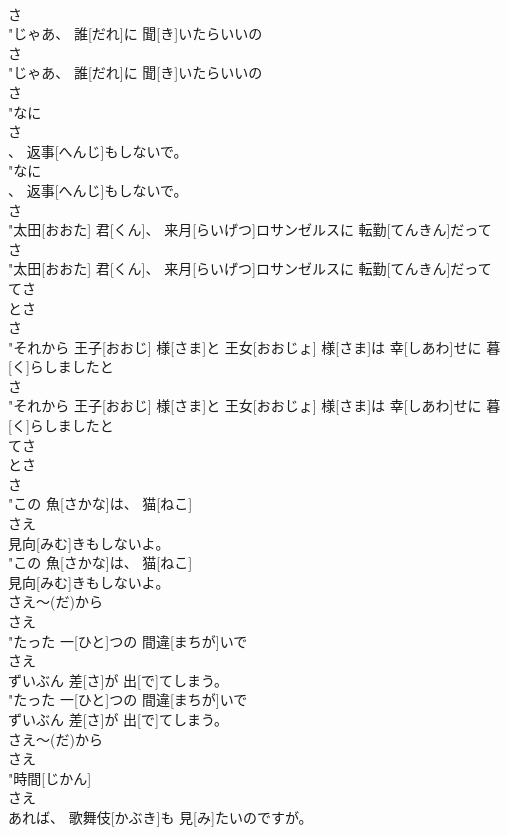 \documentclass[8pt]{extreport}
\begin{document}
\begin{CJK}{UTF8}{min}
\\	さ
\\	"じゃあ、 誰[だれ]に 聞[き]いたらいいの
\\	さ
\\	"じゃあ、 誰[だれ]に 聞[き]いたらいいの
\\	さ
\\	"なに
\\	さ
\\	、 返事[へんじ]もしないで。
\\	"なに
\\	、 返事[へんじ]もしないで。
\\	さ
\\	"太田[おおた] 君[くん]、 来月[らいげつ]ロサンゼルスに 転勤[てんきん]だって
\\	さ
\\	"太田[おおた] 君[くん]、 来月[らいげつ]ロサンゼルスに 転勤[てんきん]だって
\\	てさ 
\\	とさ	
\\	さ
\\	"それから 王子[おおじ] 様[さま]と 王女[おおじょ] 様[さま]は 幸[しあわ]せに 暮[く]らしましたと
\\	さ
\\	"それから 王子[おおじ] 様[さま]と 王女[おおじょ] 様[さま]は 幸[しあわ]せに 暮[く]らしましたと
\\	てさ 
\\	とさ	
\\	さ
\\	"この 魚[さかな]は、 猫[ねこ]
\\	さえ
\\	見向[みむ]きもしないよ。
\\	"この 魚[さかな]は、 猫[ねこ]
\\	見向[みむ]きもしないよ。
\\	さえ～(だ)から 
\\	さえ
\\	"たった 一[ひと]つの 間違[まちが]いで
\\	さえ
\\	ずいぶん 差[さ]が 出[で]てしまう。
\\	"たった 一[ひと]つの 間違[まちが]いで
\\	ずいぶん 差[さ]が 出[で]てしまう。
\\	さえ～(だ)から 
\\	さえ
\\	"時間[じかん]
\\	さえ
\\	あれば、 歌舞伎[かぶき]も 見[み]たいのですが。

\end{CJK}
\end{document}

